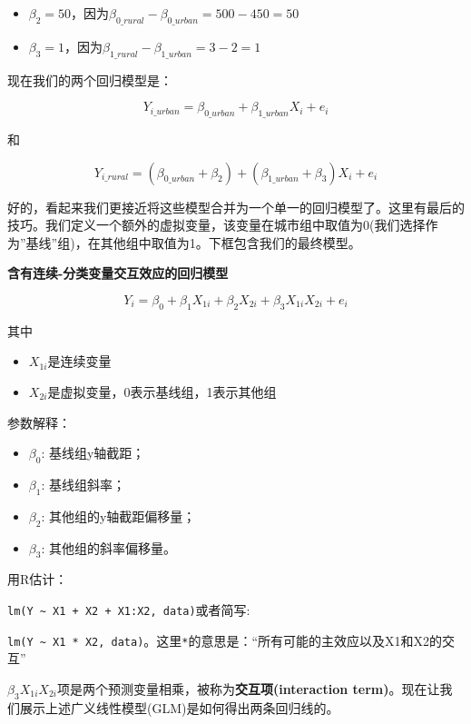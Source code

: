 \documentclass[
]{book}
\providecommand{\tightlist}{%
  \setlength{\itemsep}{0pt}\setlength{\parskip}{0pt}}
\begin{document}
\begin{itemize}
\tightlist
\item
  \(\beta_2 = 50\)，因为\(\beta_{0\_rural} - \beta_{0\_urban} = 500 - 450 = 50\)
\item
  \(\beta_3 = 1\)，因为\(\beta_{1\_rural} - \beta_{1\_urban} = 3 - 2 = 1\)
\end{itemize}

现在我们的两个回归模型是：

\[Y_{i\_urban} = \beta_{0\_urban} + \beta_{1\_urban} X_i + e_i\]

和

\[Y_{i\_rural} = (\beta_{0\_urban} + \beta_2) + (\beta_{1\_urban} + \beta_3) X_i + e_i\]

好的，看起来我们更接近将这些模型合并为一个单一的回归模型了。这里有最后的技巧。我们定义一个额外的虚拟变量，该变量在城市组中取值为0(我们选择作为''基线''组)，在其他组中取值为1。下框包含我们的最终模型。

\textbf{含有连续-分类变量交互效应的回归模型}

\[Y_{i} = \beta_0 + \beta_1 X_{1i} + \beta_2 X_{2i} + \beta_3 X_{1i} X_{2i} + e_{i}\]

其中

\begin{itemize}
\tightlist
\item
  \(X_{1i}\)是连续变量
\item
  \(X_{2i}\)是虚拟变量，0表示基线组，1表示其他组
\end{itemize}

参数解释：

\begin{itemize}
\tightlist
\item
  \(\beta_0\): 基线组y轴截距；
\item
  \(\beta_1\): 基线组斜率；
\item
  \(\beta_2\): 其他组的y轴截距偏移量；
\item
  \(\beta_3\): 其他组的斜率偏移量。
\end{itemize}

用R估计：

\texttt{lm(Y\ \textasciitilde{}\ X1\ +\ X2\ +\ X1:X2,\ data)}或者简写:

\texttt{lm(Y\ \textasciitilde{}\ X1\ *\ X2,\ data)}。这里\texttt{*}的意思是：``所有可能的主效应以及X1和X2的交互''

\(\beta_3 X_{1i} X_{2i}\)项是两个预测变量相乘，被称为\textbf{交互项(interaction term)}。现在让我们展示上述广义线性模型(GLM)是如何得出两条回归线的。
\end{document}
